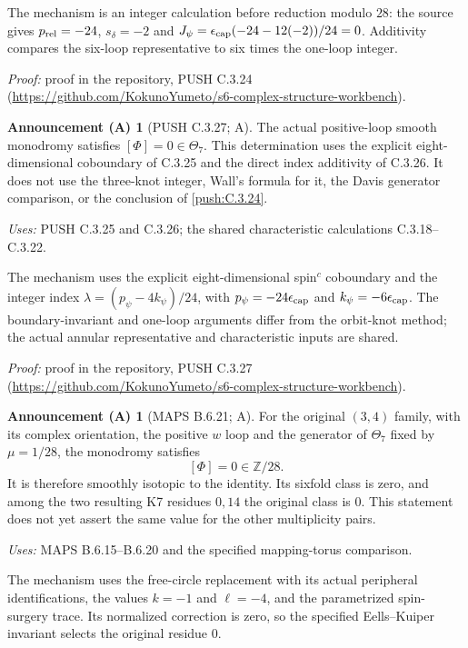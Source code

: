 \documentclass[11pt,a4paper]{article}
\theoremstyle{plain}
\theoremstyle{definition}
\newtheorem{announcement}[theorem]{Announcement (A)}
\begin{document}
The mechanism is an integer calculation before reduction modulo $28$: the source gives $p_{\rm rel}=-24$, $s_\delta=-2$ and $J_\psi=\epsilon_{\rm cap}(-24-12(-2))/24=0$. Additivity compares the six-loop representative to six times the one-loop integer.

\noindent\emph{Proof:} proof in the repository, PUSH C.3.24 (\url{https://github.com/KokunoYumeto/s6-complex-structure-workbench}).

\begin{announcement}[PUSH C.3.27; A]\label{push:C.3.27}
The actual positive-loop smooth monodromy satisfies
$[\Phi]=0\in\Theta_7$. This determination uses the explicit
eight-dimensional coboundary of C.3.25 and the direct index
additivity of C.3.26. It does not use the three-knot integer,
Wall's formula for it, the Davis generator comparison, or the
conclusion of \ref{push:C.3.24}.
\end{announcement}
\noindent\emph{Uses:} PUSH C.3.25 and C.3.26; the shared characteristic calculations C.3.18--C.3.22.\par

The mechanism uses the explicit eight-dimensional spin$^c$ coboundary and the integer index $\lambda=(p_\psi-4k_\psi)/24$, with $p_\psi=-24\epsilon_{\rm cap}$ and $k_\psi=-6\epsilon_{\rm cap}$. The boundary-invariant and one-loop arguments differ from the orbit-knot method; the actual annular representative and characteristic inputs are shared.

\noindent\emph{Proof:} proof in the repository, PUSH C.3.27 (\url{https://github.com/KokunoYumeto/s6-complex-structure-workbench}).

\begin{announcement}[MAPS B.6.21; A]\label{maps:B.6.21}
For the original $(3,4)$ family, with its complex orientation,
the positive $w$ loop and the generator of $\Theta_7$ fixed by
$\mu=1/28$, the monodromy satisfies
\[
                         [\Phi]=0\in\mathbb Z/28.
 \tag{B.6.38}
\]
It is therefore smoothly isotopic to the identity.  Its sixfold
class is zero, and among the two resulting K7 residues $0,14$
the original class is $0$.  This statement does not yet assert
the same value for the other multiplicity pairs.
\end{announcement}
\noindent\emph{Uses:} MAPS B.6.15--B.6.20 and the specified mapping-torus comparison.\par

The mechanism uses the free-circle replacement with its actual peripheral identifications, the values $k=-1$ and $\ell=-4$, and the parametrized spin-surgery trace. Its normalized correction is zero, so the specified Eells--Kuiper invariant selects the original residue $0$.
\end{document}
